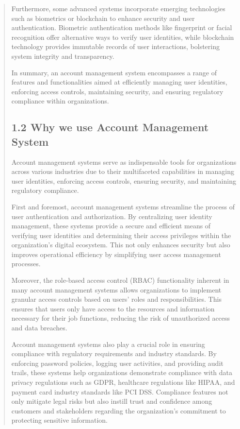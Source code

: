 \documentclass[12pt]{report}
\begin{document}
\begin{quote}
     	Furthermore, some advanced systems incorporate emerging technologies such as biometrics or blockchain to enhance security and user authentication. Biometric authentication methods like fingerprint or facial recognition offer alternative ways to verify user identities, while blockchain technology provides immutable records of user interactions, bolstering system integrity and transparency.
     	
     	In summary, an account management system encompasses a range of features and functionalities aimed at efficiently managing user identities, enforcing access controls, maintaining security, and ensuring regulatory compliance within organizations.
		\subsection{1.2 Why we use Account Management System}
	Account management systems serve as indispensable tools for organizations across various industries due to their multifaceted capabilities in managing user identities, enforcing access controls, ensuring security, and maintaining regulatory compliance.
	
	First and foremost, account management systems streamline the process of user authentication and authorization. By centralizing user identity management, these systems provide a secure and efficient means of verifying user identities and determining their access privileges within the organization's digital ecosystem. This not only enhances security but also improves operational efficiency by simplifying user access management processes.
	
	Moreover, the role-based access control (RBAC) functionality inherent in many account management systems allows organizations to implement granular access controls based on users' roles and responsibilities. This ensures that users only have access to the resources and information necessary for their job functions, reducing the risk of unauthorized access and data breaches.
	
	Account management systems also play a crucial role in ensuring compliance with regulatory requirements and industry standards. By enforcing password policies, logging user activities, and providing audit trails, these systems help organizations demonstrate compliance with data privacy regulations such as GDPR, healthcare regulations like HIPAA, and payment card industry standards like PCI DSS. Compliance features not only mitigate legal risks but also instill trust and confidence among customers and stakeholders regarding the organization's commitment to protecting sensitive information.
	

\end{quote}
\end{document}
